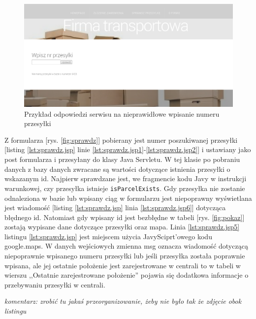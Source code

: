 \documentclass[eng,printmode,oneside]{mgr}
\begin{document}
\begin{figure}[ht!]
\centering
\includegraphics[width=\textwidth]{nieMaPrzesylki.png}
\caption{Przykład odpowiedzi serwisu na nieprawidłowe wpisanie numeru przesyłki}
\label{fig:niema}
\end{figure}


Z formularza [rys. \ref{fig:sprawdz}] pobierany jest numer poszukiwanej
przesyłki [listing \ref{lst:sprawdz.jsp} linie
\ref{lst:sprawdz.jsp1}-\ref{lst:sprawdz.jsp2}] i ustawiany jako post formularza i przesyłany do klasy Java Servletu. W tej klasie po
pobraniu danych z bazy danych zwracane są wartości dotyczące istnienia przesyłki
o wskazanym id. Najpierw sprawdzane jest, we fragmencie kodu Javy w instrukcji
warunkowej, czy przesyłka istnieje \texttt{isParcelExists}. Gdy przesyłka
nie zostanie odnaleziona w bazie lub wpisany ciąg w formularzu jest niepoprawny
wyświetlana jest wiadomość [listing \ref{lst:sprawdz.jsp} linia
\ref{lst:sprawdz.jsp6}] dotycząca błędnego id. Natomiast gdy wpisany id jest
bezbłędne w tabeli [rys.
\ref{fig:pokaz}] zostają wypisane dane dotyczące przesyłki oraz mapa. Linia
\ref{lst:sprawdz.jsp5} listingu \ref{lst:sprawdz.jsp} jest miejscem użycia
JavySciprt'owego kodu google.maps. W danych wejściowych zmienna msg oznacza wiadomość dotyczącą
niepoprawnie wpisanego numeru przesyłki lub jeśli przesyłka została poprawnie
wpisana, ale jej ostatnie położenie jest zarejestrowane w centrali to w tabeli
w wierszu ,,Ostatnie zarejestrowane położenie'' pojawia się dodatkowa informacje
o przebywaniu przesyłki w centrali.

\emph{\color{komentarz}komentarz: zrobić tu jakaś przeorganizowanie, żeby nie
było tak że zdjęcie obok listingu}
\end{document}
